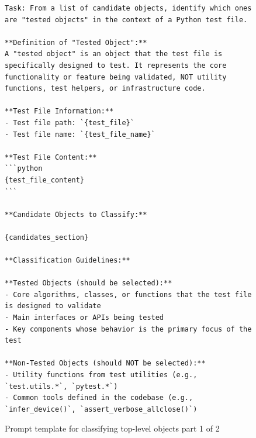 \documentclass{article}
\begin{document}
\begin{figure}[p]
\centering
\begin{tcolorbox}[
    colback=white,
    colframe=black!60,
    coltitle=white,
    colbacktitle=black!60,
    title=Prompt for classifying top-level objects part 1 of 2,
    fonttitle=\bfseries,
    boxrule=0.7pt,
    arc=1mm,
    width=1.\linewidth,
]
\begin{lstlisting}[basicstyle=\footnotesize\ttfamily, breaklines=true]
Task: From a list of candidate objects, identify which ones are "tested objects" in the context of a Python test file.

**Definition of "Tested Object":**
A "tested object" is an object that the test file is specifically designed to test. It represents the core functionality or feature being validated, NOT utility functions, test helpers, or infrastructure code.

**Test File Information:**
- Test file path: `{test_file}`
- Test file name: `{test_file_name}`

**Test File Content:**
```python
{test_file_content}
```

**Candidate Objects to Classify:**

{candidates_section}

**Classification Guidelines:**

**Tested Objects (should be selected):**
- Core algorithms, classes, or functions that the test file is designed to validate
- Main interfaces or APIs being tested
- Key components whose behavior is the primary focus of the test

**Non-Tested Objects (should NOT be selected):**
- Utility functions from test utilities (e.g., `test.utils.*`, `pytest.*`)
- Common tools defined in the codebase (e.g., `infer_device()`, `assert_verbose_allclose()`)
\end{lstlisting}
\end{tcolorbox}
\caption{Prompt template for classifying top-level objects part 1 of 2}
\label{fig:llm-classification}
\end{figure}
\end{document}
